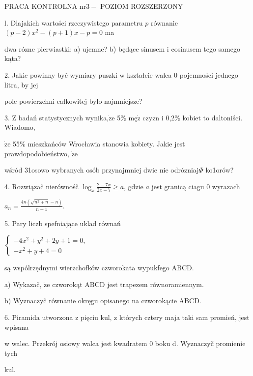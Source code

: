 \documentclass[a4paper,12pt]{article}
\begin{document}
PRACA KONTROLNA $\mathrm{n}\mathrm{r}3-$ POZIOM ROZSZERZONY

l. Dlajakich wartości rzeczywistego parametru $p$ równanie $(p-2)x^{2}-(p+1)x-p=0$ ma

dwa rózne pierwiastki: a) ujemne? b) będące sinusem $\mathrm{i}$ cosinusem tego samego kąta?

2. Jakie powinny byč wymiary puszki $\mathrm{w}$ kształcie walca $0$ pojemności jednego litra, by jej

pole powierzchni całkowitej bylo najmniejsze?

3. $\mathrm{Z}$ badań statystycznych wynika,$\dot{\mathrm{z}}\mathrm{e}$ 5\% $\mathrm{m}\text{ę}\dot{\mathrm{z}}$ czyzn $\mathrm{i}$ 0,2\% kobiet to daltoniści. Wiadomo,

$\dot{\mathrm{z}}\mathrm{e}$ 55\% mieszkańców Wrocławia stanowia kobiety. Jakie jest prawdopodobieństwo, $\dot{\mathrm{z}}\mathrm{e}$

wśród 31osowo wybranych osób przynajmniej dwie nie odrózniaj$\Phi$ ko1orów?

4. Rozwiązač nierównośč $\displaystyle \log_{x}\frac{2-7x}{2x-7}\geq a$, gdzie $a$ jest granicą ciagu $0$ wyrazach

$a_{n}=\displaystyle \frac{4n(\sqrt{n^{2}+n}-n)}{n+1}.$

5. Pary liczb spefniające uklad równań

$\left\{\begin{array}{l}
-4x^{2}+y^{2}+2y+1=0,\\
-x^{2}+y+4=0
\end{array}\right.$

są wspólrzędnymi wierzchofków czworokata wypukfego ABCD.

a) Wykazač, $\dot{\mathrm{z}}\mathrm{e}$ czworokąt ABCD jest trapezem równoramiennym.

b) Wyznaczyč równanie okręgu opisanego na czworokącie ABCD.

6. Piramida utworzona z pięciu kul, z których cztery maja taki sam promień, jest wpisana

w walec. Przekrój osiowy walca jest kwadratem 0 boku d. Wyznaczyč promienie tych

kul.
\end{document}
